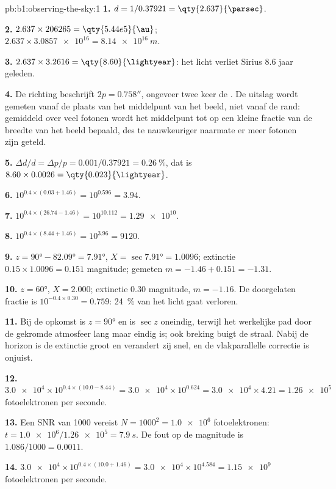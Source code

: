 \begin{solution}{pb:b1:observing-the-sky:1}
\textbf{1.} $d = 1/0.37921 = \qty{2.637}{\parsec}$.

\textbf{2.} $2.637\times206265 = \qty{5.44e5}{\au}$;
$2.637\times\num{3.0857e16} = \qty{8.14e16}{m}$.

\textbf{3.} $2.637\times3.2616 = \qty{8.60}{\lightyear}$: het licht verliet Sirius 8.6 jaar geleden.

\textbf{4.} De richting beschrijft $2p = \ang{;;0.758}$, ongeveer twee keer de
. De uitslag wordt gemeten vanaf de plaats van het middelpunt van het beeld, niet
vanaf de rand: gemiddeld over veel fotonen wordt het middelpunt tot op een kleine fractie
van de breedte van het beeld bepaald, des te nauwkeuriger naarmate er meer fotonen zijn geteld.

\textbf{5.} $\Delta d/d = \Delta p/p = 0.001/0.37921 = \qty{0.26}{\percent}$,
dat is $8.60\times0.0026 = \qty{0.023}{\lightyear}$.

\textbf{6.} $10^{0.4\times(0.03 + 1.46)} = 10^{0.596} = 3.94$.

\textbf{7.} $10^{0.4\times(26.74 - 1.46)} = 10^{10.112} = \num{1.29e10}$.

\textbf{8.} $10^{0.4\times(8.44 + 1.46)} = 10^{3.96} = \num{9120}$.

\textbf{9.} $z = \ang{90} - \ang{82.09} = \ang{7.91}$, $X = \sec\ang{7.91} =
1.0096$; extinctie $0.15\times1.0096 = 0.151$ magnitude; gemeten
$m = -1.46 + 0.151 = -1.31$.

\textbf{10.} $z = \ang{60}$, $X = 2.000$; extinctie 0.30 magnitude,
$m = -1.16$. De doorgelaten fractie is $10^{-0.4\times0.30} = 0.759$:
\qty{24}{\percent} van het licht gaat verloren.

\textbf{11.} Bij de opkomst is $z = \ang{90}$ en is $\sec z$ oneindig, terwijl het
werkelijke pad door de gekromde atmosfeer lang maar eindig is; ook breking buigt de straal.
Nabij de horizon is de extinctie groot en verandert zij snel, en de vlakparallelle correctie
is onjuist.

\textbf{12.} $\num{3.0e4}\times10^{0.4\times(10.0 - 8.44)} = \num{3.0e4}
\times10^{0.624} = \num{3.0e4}\times4.21 = \num{1.26e5}$ fotoelektronen per
seconde.

\textbf{13.} Een SNR van 1000 vereist $N = 1000^2 = \num{1.0e6}$
fotoelektronen: $t = \num{1.0e6}/\num{1.26e5} = \qty{7.9}{s}$. De fout op de magnitude
is $1.086/1000 = \num{0.0011}$.

\textbf{14.} $\num{3.0e4}\times10^{0.4\times(10.0 + 1.46)} = \num{3.0e4}
\times10^{4.584} = \num{1.15e9}$ fotoelektronen per seconde.


\end{solution}
